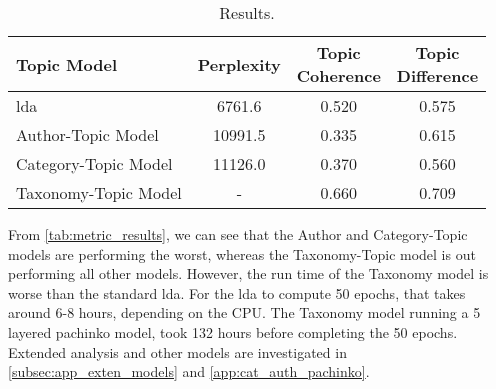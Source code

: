 \begin{table}[h]
	\centering
	\caption{Results.}
	\begin{tabular}{l|c|c|c}
		Topic Model & Perplexity & \makecell{Topic \\ Coherence} & \makecell{Topic \\ Difference} \\
		\midrule
		\Acrlong{lda} & 6761.6 & 0.520 & 0.575 \\
		Author-Topic Model & 10991.5 & 0.335 & 0.615 \\
		Category-Topic Model & 11126.0 & 0.370 & 0.560 \\
		Taxonomy-Topic Model & - & 0.660 & 0.709 \\
	\end{tabular}
	\label{tab:metric_results}
\end{table}

From \autoref{tab:metric_results}, we can see that the Author and Category-Topic models are performing the worst, whereas the Taxonomy-Topic model is out performing all other models.
However, the run time of the Taxonomy model is worse than the standard \gls{lda}.
For the \gls{lda} to compute 50 epochs, that takes around 6-8 hours, depending on the CPU. 
The Taxonomy model running a 5 layered pachinko model, took 132 hours before completing the 50 epochs.
Extended analysis and other models are investigated in \autoref{subsec:app_exten_models} and \autoref{app:cat_auth_pachinko}.
